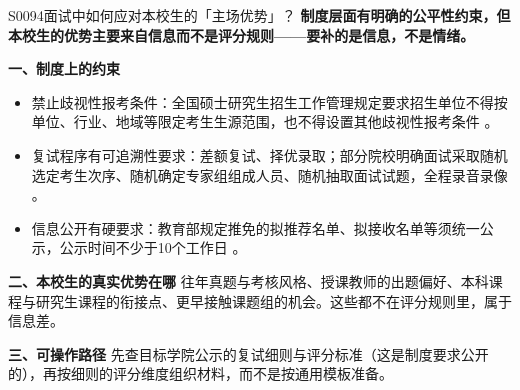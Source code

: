 \begin{qa}{S0094}{面试中如何应对本校生的「主场优势」？}
\textbf{制度层面有明确的公平性约束，但本校生的优势主要来自信息而不是评分规则——要补的是信息，不是情绪。}

\textbf{一、制度上的约束}
\begin{itemize}
  \item 禁止歧视性报考条件：全国硕士研究生招生工作管理规定要求招生单位不得按单位、行业、地域等限定考生生源范围，也不得设置其他歧视性报考条件 。
  \item 复试程序有可追溯性要求：差额复试、择优录取；部分院校明确面试采取随机选定考生次序、随机确定专家组组成人员、随机抽取面试试题，全程录音录像 。
  \item 信息公开有硬要求：教育部规定推免的拟推荐名单、拟接收名单等须统一公示，公示时间不少于10个工作日 。
\end{itemize}

\textbf{二、本校生的真实优势在哪}
往年真题与考核风格、授课教师的出题偏好、本科课程与研究生课程的衔接点、更早接触课题组的机会。这些都不在评分规则里，属于信息差。

\textbf{三、可操作路径}
先查目标学院公示的复试细则与评分标准（这是制度要求公开的），再按细则的评分维度组织材料，而不是按通用模板准备。
\end{qa}

